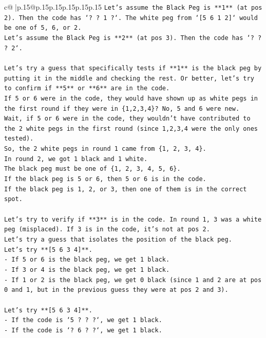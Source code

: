 \documentclass{article}
\begin{document}
{\begin{supertabular}{c@{$\;$}|p{.15\linewidth}@{}p{.15\linewidth}p{.15\linewidth}p{.15\linewidth}p{.15\linewidth}p{.15\linewidth}}
{{{\texttt{Let's assume the Black Peg is **1** (at pos 2). Then the code has `? ? 1 ?`. The white peg from `{[}5 6 1 2{]}` would be one of 5, 6, or 2.} \\
\texttt{Let's assume the Black Peg is **2** (at pos 3). Then the code has `? ? ? 2`.} \\
\\ 
\texttt{Let's try a guess that specifically tests if **1** is the black peg by putting it in the middle and checking the rest. Or better, let's try to confirm if **5** or **6** are in the code.} \\
\texttt{If 5 or 6 were in the code, they would have shown up as white pegs in the first round if they were in \{1,2,3,4\}? No, 5 and 6 were new.} \\
\texttt{Wait, if 5 or 6 were in the code, they wouldn't have contributed to the 2 white pegs in the first round (since 1,2,3,4 were the only ones tested).} \\
\texttt{So, the 2 white pegs in round 1 came from \{1, 2, 3, 4\}.} \\
\texttt{In round 2, we got 1 black and 1 white.} \\
\texttt{The black peg must be one of \{1, 2, 3, 4, 5, 6\}.} \\
\texttt{If the black peg is 5 or 6, then 5 or 6 is in the code.} \\
\texttt{If the black peg is 1, 2, or 3, then one of them is in the correct spot.} \\
\\ 
\texttt{Let's try to verify if **3** is in the code. In round 1, 3 was a white peg (misplaced). If 3 is in the code, it's not at pos 2.} \\
\texttt{Let's try a guess that isolates the position of the black peg.} \\
\texttt{Let's try **{[}5 6 3 4{]}**.} \\
\texttt{{-} If 5 or 6 is the black peg, we get 1 black.} \\
\texttt{{-} If 3 or 4 is the black peg, we get 1 black.} \\
\texttt{{-} If 1 or 2 is the black peg, we get 0 black (since 1 and 2 are at pos 0 and 1, but in the previous guess they were at pos 2 and 3).} \\
\\ 
\texttt{Let's try **{[}5 6 3 4{]}**.} \\
\texttt{{-} If the code is `5 ? ? ?`, we get 1 black.} \\
\texttt{{-} If the code is `? 6 ? ?`, we get 1 black.} \\
}}}
\end{supertabular}}
\end{document}
